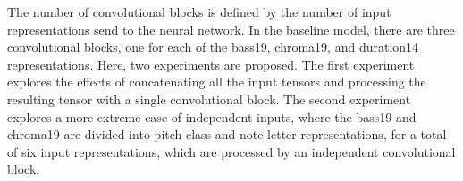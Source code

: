 
The number of convolutional blocks is defined by the number
of input representations send to the neural network. In the
baseline model, there are three convolutional blocks, one
for each of the \gls{bass19}, \gls{chroma19}, and
\gls{duration14} representations. Here, two experiments are
proposed. The first experiment explores the effects of
concatenating all the input tensors and processing the
resulting tensor with a single convolutional block. The
second experiment explores a more extreme case of
independent inputs, where the \gls{bass19} and
\gls{chroma19} are divided into pitch class and note letter
representations, for a total of six input representations,
which are processed by an independent convolutional block.

